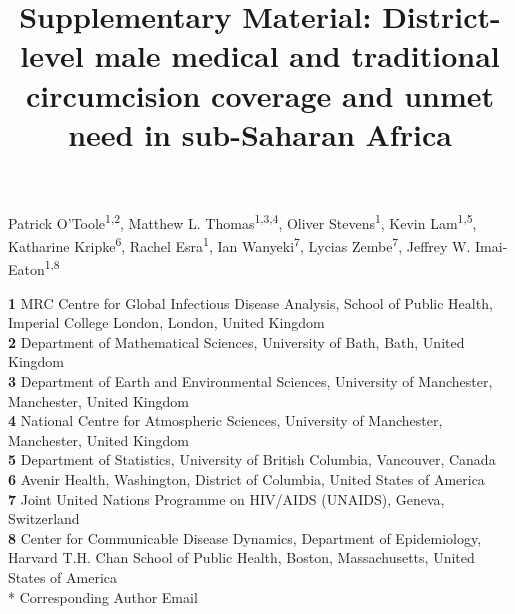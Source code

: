 \documentclass{article}
\title{Supplementary Material: District-level male medical and traditional circumcision coverage and unmet need in sub-Saharan Africa}
\author{}
\date{}
\begin{document}

\maketitle

\vspace{-1cm}

Patrick O'Toole\textsuperscript{1,2},
Matthew L. Thomas\textsuperscript{1,3,4},
Oliver Stevens\textsuperscript{1},
Kevin Lam\textsuperscript{1,5},
Katharine Kripke\textsuperscript{6},
Rachel Esra\textsuperscript{1},
Ian Wanyeki\textsuperscript{7},
Lycias Zembe\textsuperscript{7},
Jeffrey W. Imai-Eaton\textsuperscript{1,8} \\
\smallskip

\textbf{1} MRC Centre for Global Infectious Disease Analysis, School of Public Health, Imperial College London, London, United Kingdom\\
\textbf{2} Department of Mathematical Sciences, University of Bath, Bath, United Kingdom\\
\textbf{3} Department of Earth and Environmental Sciences, University of Manchester, Manchester, United Kingdom\\
\textbf{4} National Centre for Atmospheric Sciences, University of Manchester, Manchester, United Kingdom\\
\textbf{5} Department of Statistics, University of British Columbia, Vancouver, Canada\\
\textbf{6} Avenir Health, Washington, District of Columbia, United States of America\\
\textbf{7} Joint United Nations Programme on HIV/AIDS (UNAIDS), Geneva, Switzerland\\
\textbf{8} Center for Communicable Disease Dynamics, Department of Epidemiology, Harvard T.H. Chan School of Public Health, Boston, Massachusetts, United States of America\\

* Corresponding Author Email

\newpage

\end{document}
